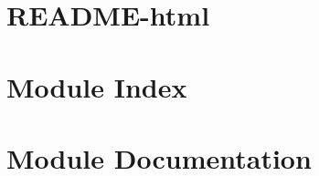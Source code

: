 \documentclass[twoside]{book}
\begin{document}
\chapter{R\-E\-A\-D\-M\-E-\/html}
\label{md_README-html}
\hypertarget{md_README-html}{}

\chapter{Module Index}

\chapter{Module Documentation}









\newpage
{}
{}
\printindex
\end{document}
